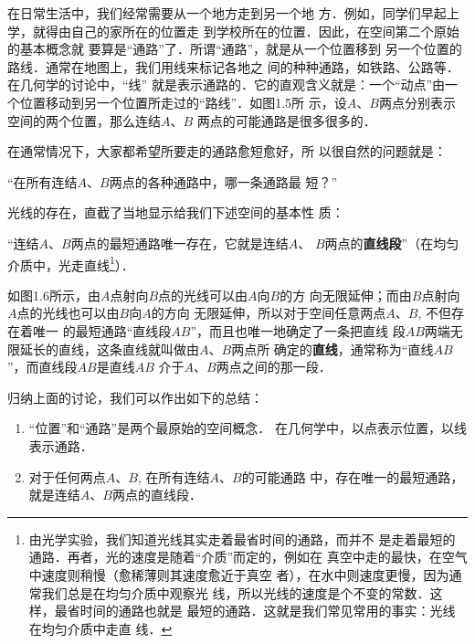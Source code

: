 在日常生活中，我们经常需要从一个地方走到另一个地
方．例如，同学们早起上学，就得由自己的家所在的位置走
到学校所在的位置．因此，在空间第二个原始的基本概念就
要算是“通路”了．所谓“通路”，就是从一个位置移到
另一个位置的路线．通常在地图上，我们用线来标记各地之
间的种种通路，如铁路、公路等．在几何学的讨论中，“线”
就是表示通路的．它的直观含义就是：一个“动点”由一
个位置移动到另一个位置所走过的“路线”．如图1.5所
示，设$A$、$B$两点分别表示空间的两个位置，那么连结$A$、$B$
两点的可能通路是很多很多的．

在通常情况下，大家都希望所要走的通路愈短愈好，所
以很自然的问题就是：

“在所有连结$A$、$B$两点的各种通路中，哪一条通路最
短？”

光线的存在，直截了当地显示给我们下述空间的基本性
质：

“连结$A$、$B$两点的最短通路唯一存在，它就是连结$A$、
$B$两点的\textbf{直线段}”（在均匀介质中，光走直线\footnote{由光学实验，我们知道光线其实走着最省时间的通路，而并不
	是走着最短的通路．再者，光的速度是随着“介质”而定的，例如在
	真空中走的最快，在空气中速度则稍慢（愈稀薄则其速度愈近于真空
	者），在水中则速度更慢，因为通常我们总是在均匀介质中观察光
	线，所以光线的速度是个不变的常数．这样，最省时间的通路也就是
	最短的通路．这就是我们常见常用的事实：光线在均匀介质中走直
	线．}）．

\begin{figure}[htp]
	\centering
{}
	\caption{}
\end{figure}


如图1.6所示，由$A$点射向$B$点的光线可以由$A$向$B$的方
向无限延伸；而由$B$点射向$A$点的光线也可以由$B$向$A$的方向
无限延伸，所以对于空间任意两点$A$、$B$, 不但存在着唯一
的最短通路“直线段$AB$”，而且也唯一地确定了一条把直线
段$AB$两端无限延长的直线，这条直线就叫做由$A$、$B$两点所
确定的\textbf{直线}，通常称为“直线$AB$”，而直线段$AB$是直线$AB$
介于$A$、$B$两点之间的那一段．

归纳上面的讨论，我们可以作出如下的总结：

\begin{enumerate}
	\item “位置”和“通路”是两个最原始的空间概念．
在几何学中，以点表示位置，以线表示通路．
\item 对于任何两点$A$、$B$, 在所有连结$A$、$B$的可能通路
中，存在唯一的最短通路，就是连结$A$、$B$两点的直线段．
\end{enumerate}

